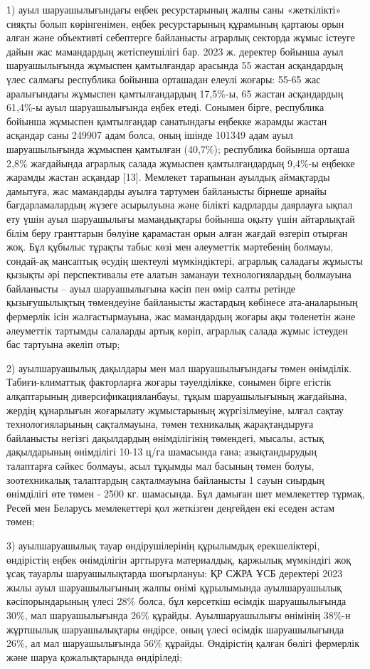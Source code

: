 \begin{multicols}{2}
1) ауыл шаруашылығындағы еңбек ресурстарының жалпы саны «жеткілікті»
сияқты болып көрінгенімен, еңбек ресурстарының құрамының қартаюы орын
алған және объективті себептерге байланысты аграрлық секторда жұмыс
істеуге дайын жас мамандардың жетіспеушілігі бар. 2023 ж. деректер
бойынша ауыл шаруашылығында жұмыспен қамтылғандар арасында 55 жастан
асқандардың үлес салмағы республика бойынша орташадан елеулі жоғары:
55-65 жас аралығындағы жұмыспен қамтылғандардың 17,5\%-ы, 65 жастан
асқандардың 61,4\%-ы ауыл шаруашылығында еңбек етеді. Сонымен бірге,
республика бойынша жұмыспен қамтылғандар санатындағы еңбекке жарамды
жастан асқандар саны 249907 адам болса, оның ішінде 101349 адам ауыл
шаруашылығында жұмыспен қамтылған (40,7\%); республика бойынша орташа
2,8\% жағдайында аграрлық салада жұмыспен қамтылғандардың 9,4\%-ы
еңбекке жарамды жастан асқандар {[}13{]}. Мемлекет тарапынан ауылдық
аймақтарды дамытуға, жас мамандарды ауылға тартумен байланысты бірнеше
арнайы бағдарламалардың жүзеге асырылуына және білікті кадрларды
даярлауға ықпал ету үшін ауыл шаруашылығы мамандықтары бойынша оқыту
үшін айтарлықтай білім беру гранттарын бөлуіне қарамастан орын алған
жағдай өзгеріп отырған жоқ. Бұл құбылыс тұрақты табыс көзі мен
әлеуметтік мәртебенің болмауы, сондай-ақ мансаптық өсудің шектеулі
мүмкіндіктері, аграрлық саладағы жұмысты қызықты әрі перспективалы ете
алатын заманауи технологиялардың болмауына байланысты -- ауыл
шаруашылығына кәсіп пен өмір салты ретінде қызығушылықтың төмендеуіне
байланысты жастардың көбінесе ата-аналарының фермерлік ісін
жалғастырмауына, жас мамандардың жоғары ақы төленетін және әлеуметтік
тартымды салаларды артық көріп, аграрлық салада жұмыс істеуден бас
тартуына әкеліп отыр;

2) ауылшаруашылық дақылдары мен мал шаруашылығындағы төмен өнімділік.
Табиғи-климаттық факторларға жоғары тәуелділікке, сонымен бірге егістік
алқаптарының диверсификацияланбауы, тұқым шаруашылығының жағдайына,
жердің құнарлығын жоғарылату жұмыстарының жүргізілмеуіне, ылғал сақтау
технологияларының сақталмауына, төмен техникалық жарақтандыруға
байланысты негізгі дақылдардың өнімділігінің төмендегі, мысалы, астық
дақылдарының өнімділігі 10-13 ц/га шамасында ғана; азықтандырудың
талаптарға сәйкес болмауы, асыл тұқымды мал басының төмен болуы,
зоотехникалық талаптардың сақталмауына байланысты 1 сауын сиырдың
өнімділігі өте төмен - 2500 кг. шамасында. Бұл дамыған шет мемлекеттер
тұрмақ, Ресей мен Беларусь мемлекеттері қол жеткізген деңгейден екі
еседен астам төмен;

3) ауылшаруашылық тауар өндірушілерінің құрылымдық ерекшеліктері,
өндірістің еңбек өнімділігін арттыруға материалдық, қаржылық мүмкіндігі
жоқ ұсақ тауарлы шаруашылықтарда шоғырлануы: ҚР СЖРА ҰСБ деректері 2023
жылы ауыл шаруашылығының жалпы өнімі құрылымында ауылшаруашылық
кәсіпорындарының үлесі 28\% болса, бұл көрсеткіш өсімдік шаруашылығында
30\%, мал шаруашылығында 26\% құрайды. Ауылшаруашылығы өнімінің 38\%-н
жұртшылық шаруашылықтары өндірсе, оның үлесі өсімдік шаруашылығында
26\%, ал мал шаруашылығында 56\% құрайды. Өндірістің қалған бөлігі
фермерлік және шаруа қожалықтарында өндіріледі;


\end{multicols}
